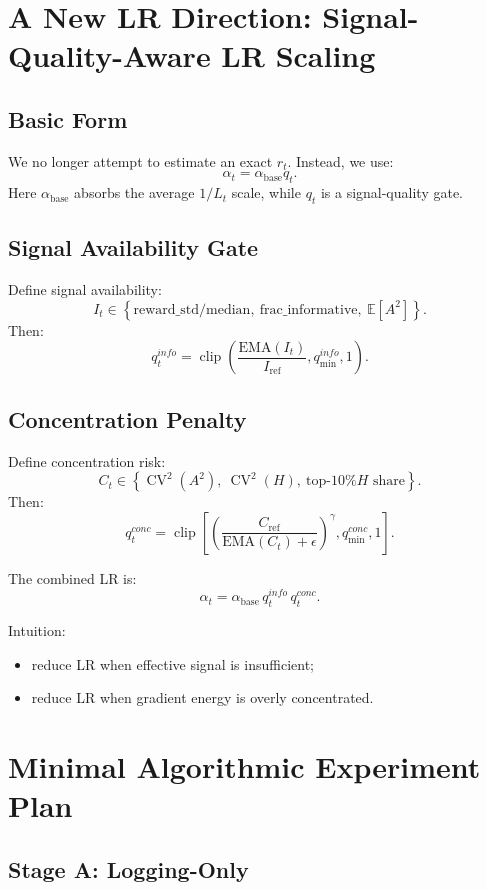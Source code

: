 \documentclass[11pt,a4paper]{article}
\newcommand{\E}{\mathbb{E}}
\newcommand{\clip}{\operatorname{clip}}
\newcommand{\CV}{\operatorname{CV}}
\begin{document}
\section{A New LR Direction: Signal-Quality-Aware LR Scaling}

\subsection{Basic Form}

We no longer attempt to estimate an exact \(r_t\). Instead, we use:
\[
\boxed{
\alpha_t=\alpha_{\mathrm{base}} q_t.
}
\]
Here \(\alpha_{\mathrm{base}}\) absorbs the average \(1/L_t\) scale, while \(q_t\) is a signal-quality gate.

\subsection{Signal Availability Gate}

Define signal availability:
\[
I_t\in\left\{
\mathrm{reward\_std/median},\ 
\mathrm{frac\_informative},\ 
\E[A^2]
\right\}.
\]
Then:
\[
q_t^{info}
=
\clip\left(
\frac{\mathrm{EMA}(I_t)}
{I_{\mathrm{ref}}},
q_{\min}^{info},
1
\right).
\]

\subsection{Concentration Penalty}

Define concentration risk:
\[
C_t\in\left\{
\CV^2(A^2),\ 
\CV^2(H),\ 
\text{top-10\% }H\text{ share}
\right\}.
\]
Then:
\[
q_t^{conc}
=
\clip\left[
\left(
\frac{C_{\mathrm{ref}}}{\mathrm{EMA}(C_t)+\epsilon}
\right)^\gamma,
q_{\min}^{conc},
1
\right].
\]

The combined LR is:
\[
\boxed{
\alpha_t
=
\alpha_{\mathrm{base}}\,
q_t^{info}\,
q_t^{conc}.
}
\]

Intuition:
\begin{itemize}[leftmargin=2em]
    \item reduce LR when effective signal is insufficient;
    \item reduce LR when gradient energy is overly concentrated.
\end{itemize}

\section{Minimal Algorithmic Experiment Plan}

\subsection{Stage A: Logging-Only}
\end{document}
